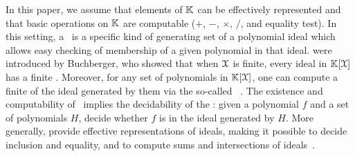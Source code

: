 \AP In this paper, we assume that elements of $\mathbb{K}$ can be effectively represented
and that basic operations on $\mathbb{K}$ are computable
($+$, $-$, $\times$, $/$, and equality test).
In this setting, a \Grb\ is a specific kind of generating set of a polynomial ideal
which allows easy checking of membership of a given polynomial in that ideal.
 were introduced by Buchberger, who showed that when $\mathcal{X}$ is
finite, every ideal in $\mathbb{K}[\mathcal{X}]$ has a finite . Moreover,
for any set of polynomials in $\mathbb{K}[\mathcal{X}]$, one can compute a
finite  of the ideal generated by them via the so-called
~\cite{BUCH76}. The
existence and computability of \Grbs\ implies the decidability of the
: given a polynomial $f$ and a set of polynomials
$H$, decide whether $f$ is in the ideal generated by $H$. 
More generally,  provide effective representations of ideals,
making it possible to decide inclusion and equality, and to compute sums and intersections
of ideals~\cite{CLO15}.

%

%

